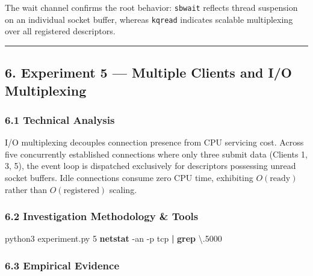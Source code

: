\documentclass[
]{article}
\newenvironment{Shaded}{\begin{snugshade}}{\end{snugshade}}
\newcommand{\AttributeTok}[1]{\textcolor[rgb]{0.13,0.29,0.53}{#1}}
\newcommand{\ExtensionTok}[1]{#1}
\newcommand{\FunctionTok}[1]{\textcolor[rgb]{0.13,0.29,0.53}{\textbf{#1}}}
\newcommand{\KeywordTok}[1]{\textcolor[rgb]{0.13,0.29,0.53}{\textbf{#1}}}
\newcommand{\NormalTok}[1]{#1}
\newcommand{\StringTok}[1]{\textcolor[rgb]{0.31,0.60,0.02}{#1}}
\begin{document}
The wait channel confirms the root behavior: \texttt{sbwait} reflects
thread suspension on an individual socket buffer, whereas
\texttt{kqread} indicates scalable multiplexing over all registered
descriptors.

\begin{center}\rule{0.5\linewidth}{0.5pt}\end{center}

\hypertarget{experiment-5-multiple-clients-and-io-multiplexing}{%
\subsection{6. Experiment 5 --- Multiple Clients and I/O
Multiplexing}\label{experiment-5-multiple-clients-and-io-multiplexing}}

\hypertarget{technical-analysis-4}{%
\subsubsection{6.1 Technical Analysis}\label{technical-analysis-4}}

I/O multiplexing decouples connection presence from CPU servicing cost.
Across five concurrently established connections where only three submit
data (Clients 1, 3, 5), the event loop is dispatched exclusively for
descriptors possessing unread socket buffers. Idle connections consume
zero CPU time, exhibiting \(O(\text{ready})\) rather than
\(O(\text{registered})\) scaling.

\hypertarget{investigation-methodology-tools-3}{%
\subsubsection{6.2 Investigation Methodology \&
Tools}\label{investigation-methodology-tools-3}}

\begin{Shaded}
\begin{Highlighting}[]
\ExtensionTok{python3}\NormalTok{ experiment.py 5}
\FunctionTok{netstat} \AttributeTok{{-}an} \AttributeTok{{-}p}\NormalTok{ tcp }\KeywordTok{|} \FunctionTok{grep} \StringTok{\textquotesingle{}\textbackslash{}.5000 \textquotesingle{}}
\end{Highlighting}
\end{Shaded}

\hypertarget{empirical-evidence-4}{%
\subsubsection{6.3 Empirical Evidence}\label{empirical-evidence-4}}
\end{document}
